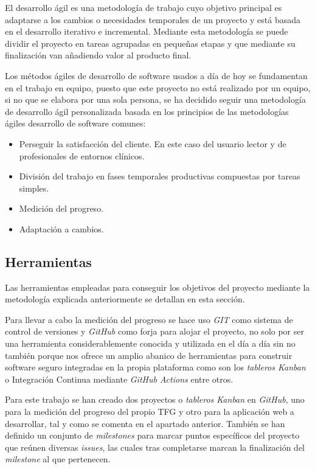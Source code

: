 El desarrollo ágil es una metodología de trabajo cuyo objetivo principal es adaptarse a los cambios o necesidades
temporales de un proyecto y está basada en el desarrollo iterativo e incremental.
Mediante esta metodología se puede dividir el proyecto en tareas agrupadas en pequeñas etapas y que mediante su
finalización van añadiendo valor al producto final.

Los métodos ágiles de desarrollo de software usados a día de hoy se fundamentan en el trabajo en equipo, puesto que este
proyecto no está realizado por un equipo, si no que se elabora por una sola persona, se ha decidido seguir una
metodología de desarrollo ágil personalizada basada en los principios de las metodologías ágiles desarrollo de
software comunes:
\begin{itemize}
    \item Perseguir la satisfacción del cliente.
    En este caso del usuario lector y de profesionales de entornos clínicos.
    \item División del trabajo en fases temporales productivas compuestas por tareas simples.
    \item Medición del progreso.
    \item Adaptación a cambios.\\
\end{itemize}

\subsection{Herramientas}\label{subsec:herramientas}
Las herramientas empleadas para conseguir los objetivos del proyecto mediante la metodología explicada anteriormente se
detallan en esta sección.

Para llevar a cabo la medición del progreso se hace uso \textit{GIT} como sistema de control de versiones y
\textit{GitHub} como forja para alojar el proyecto, no solo por ser una herramienta considerablemente conocida y
utilizada en el día a día sin no también porque nos ofrece un amplio abanico de herramientas para construir software
seguro integradas en la propia plataforma como son los \textit{tableros Kanban} o Integración Continua mediante
\textit{GitHub Actions} entre otros.

Para este trabajo se han creado dos proyectos o \textit{tableros Kanban} en \textit{GitHub}, uno para la medición del
progreso del propio TFG y otro para la aplicación web a desarrollar, tal y como se comenta en el apartado anterior.
También se han definido un conjunto de \textit{milestones} para marcar puntos específicos del proyecto que reúnen diversas
\textit{issues}, las cuales tras completarse marcan la finalización del \textit{milestone} al que pertenecen.


